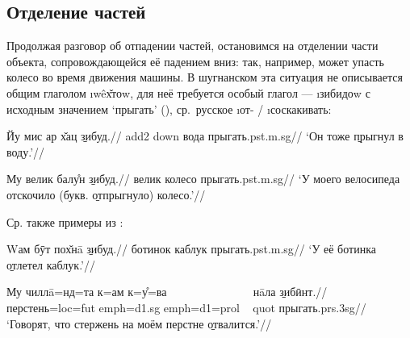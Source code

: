 \subsection{Отделение частей} \label{down-parting}

Продолжая разговор об отпадении частей, остановимся на отделении части объекта, сопровождающейся её падением вниз: так, например, может упасть колесо во время движения машины. В шугнанском эта ситуация не описывается общим глаголом \i{wêх̌тоw}, для неё требуется особый глагол — \i{зибидоw} с исходным значением ‘прыгать’ (), ср.~русское \i{от}- / \i{соскакивать}:

\begingl
\gla Йу мис ар х̌ац \b{зибуд}.//
 {\sc add2} {\sc down} вода прыгать.{\sc pst.m.sg}//
\glft ‘Он тоже \b{прыгнул} в воду.’//
\endgl \xe

\begingl
\gla Му велик балу̊н \b{зибуд}.//
 велик колесо прыгать.{\sc pst.m.sg}//
\glft ‘У моего велосипеда отскочило (букв. \b{отпрыгнуло}) колесо.’//
\endgl \xe

Ср. также примеры из \parencite[451]{karamshoev1991}:

\begingl
\gla Wам бӯт пох̌нā \b{зибуд}.//
 ботинок каблук прыгать.{\sc pst.m.sg}//
\glft ‘У её ботинка \b{отлетел} каблук.’//
\endgl \xe

\begingl
\gla Му чиллā=нд=та к=ам к=у̊=ва ~~~~~~~~~~~~~~ нāла \b{зибӣнт}.//
 перстень={\sc loc=fut} {\sc emph=d1.sg} {\sc emph=d1=prol} ~ {\sc quot} прыгать.{\sc prs.3sg}//
\glft ‘Говорят, что стержень на моём перстне \b{отвалится}.’//
\endgl \xe

